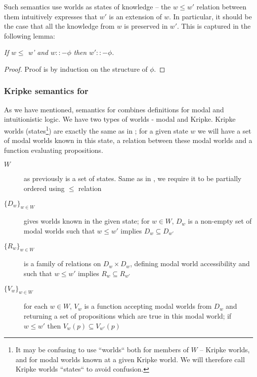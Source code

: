 Such semantics use worlds as states of knowledge -- the $w \leq w'$ relation between them intuitively expresses that $w'$ is an extension of $w$. In particular, it should be the case that all the knowledge from $w$ is preserved in $w'$. This is captured in the following lemma:

\begin{lemma}[Monotonicity]\em
If $w \leq$ w' and $w ::- \phi$ then $w' ::- \phi$.
\begin{proof}
Proof is by induction on the structure of $\phi$.
\end{proof}
\end{lemma}

\subsubsection{Kripke semantics for \IML{}}

As we have mentioned, semantics for \IML{} combines definitions for modal and intuitionistic logic. We have two types of worlds - modal and Kripke. Kripke worlds (states\footnote{It may be confusing to use ``worlds`` both for members of $W$ -- Kripke worlds, and for modal worlds known at a given Kripke world. We will therefore call Kripke worlds ``states`` to avoid confusion.}) are exactly the same as in \IL{}; for a given state $w$ we will have a set of modal worlds known in this state, a relation between these modal worlds and a function evaluating propositions.

\begin{description}
\item[$W$] as previously is a set of states. Same as in \IL{}, we require it to be partially ordered using $\leq$ relation
\item[$\{ D_w\}_{w \in W}$] gives worlds known in the given state; for $w \in W$, $D_w$ is a non-empty set of modal worlds such that $ w \leq w'$ implies $D_w \subseteq D_{w'}$
\item [$\{ R_w\}_{w \in W}$] is a family of relations on $D_w \times D_w$, defining modal world accessibility and such that $ w \leq w'$ implies $R_w \subseteq R_{w'}$
\item[$\{V_w\}_{w\in W}$] for each $w \in W$, $V_w$ is a function accepting modal worlds from $D_w$ and returning a set of propositions which are true in this modal world; if $w \leq w'$ then $V_w(p) \subseteq V_{w'}(p)$
\end {description}

